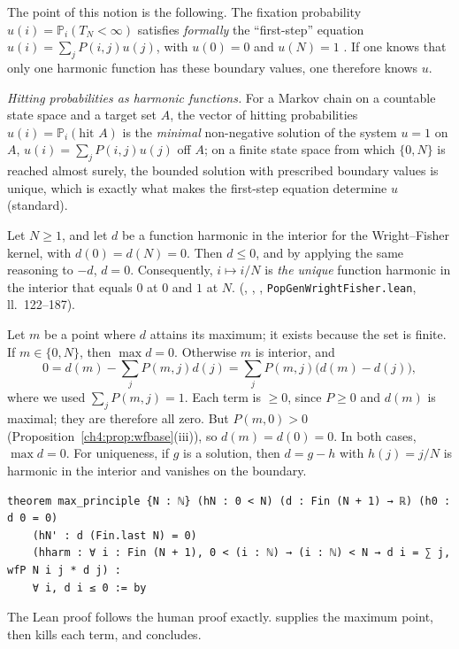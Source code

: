 The point of this notion is the following. The fixation probability $u(i)=\mathbb P_i(T_N<\infty)$ satisfies
\emph{formally} the ``first-step'' equation $u(i)=\sum_jP(i,j)u(j)$, with $u(0)=0$ and $u(N)=1$ \tierC.
If one knows that only one harmonic function has these boundary values, one therefore knows $u$.

\begin{uniremark}\tierL{} \emph{Hitting probabilities as harmonic functions.} For a Markov chain on a countable
state space and a target set $A$, the vector of hitting probabilities $u(i)=\mathbb P_i(\text{hit }A)$ is the
\emph{minimal} non-negative solution of the system $u=1$ on $A$, $u(i)=\sum_jP(i,j)u(j)$ off $A$; on a
finite state space from which $\{0,N\}$ is reached almost surely, the bounded solution with prescribed boundary
values is unique, which is exactly what makes the first-step equation determine $u$ \cite{app:norris} (standard).
\end{uniremark}

\begin{theorem}\label{ch4:thm:maxprinc}
Let $N\ge1$, and let $d$ be a function harmonic in the interior for the Wright--Fisher kernel, with $d(0)=d(N)=0$.
Then $d\le0$, and by applying the same reasoning to $-d$, $d=0$. Consequently, $i\mapsto i/N$ is
\emph{the unique} function harmonic in the interior that equals $0$ at $0$ and $1$ at $N$. \tierA{} (,
, , \texttt{PopGenWrightFisher.lean}, ll.~122--187).
\end{theorem}

\begin{humanproof}
Let $m$ be a point where $d$ attains its maximum; it exists because the set is finite. If $m\in\{0,N\}$, then
$\max d=0$. Otherwise $m$ is interior, and
\[
0=d(m)-\sum_jP(m,j)d(j)=\sum_jP(m,j)\bigl(d(m)-d(j)\bigr),
\]
where we used $\sum_jP(m,j)=1$. Each term is $\ge0$, since $P\ge0$ and $d(m)$ is maximal; they
are therefore all zero. But $P(m,0)>0$ (Proposition~\ref{ch4:prop:wfbase}(iii)), so $d(m)=d(0)=0$. In both
cases, $\max d=0$. For uniqueness, if $g$ is a solution, then $d=g-h$ with $h(j)=j/N$ is harmonic in the interior and
vanishes on the boundary.
\end{humanproof}

\begin{leanbox}
\begin{lstlisting}[language=Lean]
theorem max_principle {N : ℕ} (hN : 0 < N) (d : Fin (N + 1) → ℝ) (h0 : d 0 = 0)
    (hN' : d (Fin.last N) = 0)
    (hharm : ∀ i : Fin (N + 1), 0 < (i : ℕ) → (i : ℕ) < N → d i = ∑ j, wfP N i j * d j) :
    ∀ i, d i ≤ 0 := by
\end{lstlisting}
The Lean proof follows the human proof exactly.  supplies the maximum point, then
 kills each term, and  concludes.
\end{leanbox}

